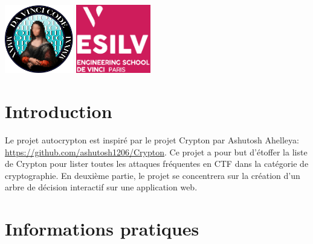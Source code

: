 \documentclass[12pt]{article}
\begin{document}
    \backgroundpages
    \setlength{\columnsep}{-1cm}
    \begin{multicols}{2}\raggedbottom\color{white}
        \noindent
        \parbox[t][40mm][t]{\columnwidth}{\setlength{\parindent}{1em}
        \vspace*{-18mm}
        \includegraphics[height=30mm]{davincicode}
        \includegraphics[height=30mm]{esilv}
        }

        \noindent
        \parbox[c][40mm][c]{\columnwidth}{\setlength{\parindent}{0em}
        \shadowoffsetx{1pt}
        \shadowoffsety{0pt}
        \vspace*{-24mm}
        \vspace{0.5cm}
        }

    \end{multicols}
    \vspace*{-30mm}
    \raggedbottom
    \section{Introduction}
    Le projet autocrypton est inspiré par le projet Crypton par Ashutosh Ahelleya: \url{https://github.com/ashutosh1206/Crypton}. Ce projet a pour but d'étoffer la liste de Crypton pour lister toutes les attaques fréquentes en CTF dans la catégorie de cryptographie. En deuxième partie, le projet se concentrera sur la création d'un arbre de décision interactif sur une application web.

	\section{Informations pratiques}
\end{document}
